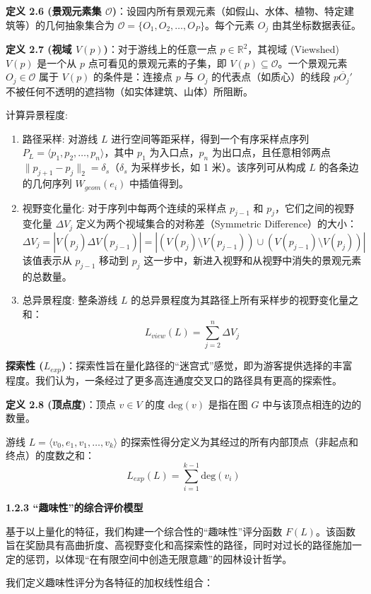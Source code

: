 \documentclass[11pt]{article}
\theoremstyle{definition}
\begin{document}
\textbf{定义 2.6 (景观元素集 $\mathcal{O}$)}：设园内所有景观元素（如假山、水体、植物、特定建筑等）的几何抽象集合为 $\mathcal{O} = \{O_1, O_2, \dots, O_P\}$。每个元素 $O_j$ 由其坐标数据表征。

\textbf{定义 2.7 (视域 $V(p)$)}：对于游线上的任意一点 $p \in \mathbb{R}^2$，其视域 (Viewshed) $V(p)$ 是一个从 $p$ 点可看见的景观元素的子集，即 $V(p) \subseteq \mathcal{O}$。一个景观元素 $O_j \in \mathcal{O}$ 属于 $V(p)$ 的条件是：连接点 $p$ 与 $O_j$ 的代表点（如质心）的线段 $\overline{p O_j'}$ 不被任何不透明的遮挡物（如实体建筑、山体）所阻断。

计算异景程度:
\begin{enumerate}
	\item 路径采样: 对游线 $L$ 进行空间等距采样，得到一个有序采样点序列 $P_L = \langle p_1, p_2, \dots, p_n \rangle$，其中 $p_1$ 为入口点，$p_n$ 为出口点，且任意相邻两点 $\|p_{j+1} - p_j\|_2 = \delta_s$（$\delta_s$ 为采样步长，如 1 米）。该序列可从构成 $L$ 的各条边的几何序列 $W_{geom}(e_i)$ 中插值得到。
	\item 视野变化量化: 对于序列中每两个连续的采样点 $p_{j-1}$ 和 $p_j$，它们之间的视野变化量 $\Delta V_j$ 定义为两个视域集合的对称差（Symmetric Difference）的大小：
	$$ \Delta V_j = |V(p_j) \Delta V(p_{j-1})| = |(V(p_j) \setminus V(p_{j-1})) \cup (V(p_{j-1}) \setminus V(p_j))| $$
	该值表示从 $p_{j-1}$ 移动到 $p_j$ 这一步中，新进入视野和从视野中消失的景观元素的总数量。
	\item 总异景程度: 整条游线 $L$ 的总异景程度为其路径上所有采样步的视野变化量之和：
	$$ L_{view}(L) = \sum_{j=2}^{n} \Delta V_j $$
\end{enumerate}

\textbf{探索性 ($L_{exp}$)}：探索性旨在量化路径的“迷宫式”感觉，即为游客提供选择的丰富程度。我们认为，一条经过了更多高连通度交叉口的路径具有更高的探索性。

\textbf{定义 2.8 (顶点度)}：顶点 $v \in V$ 的度 $\text{deg}(v)$ 是指在图 $G$ 中与该顶点相连的边的数量。

游线 $L = \langle v_0, e_1, v_1, \dots, v_k \rangle$ 的探索性得分定义为其经过的所有内部顶点（非起点和终点）的度数之和：
$$ L_{exp}(L) = \sum_{i=1}^{k-1} \text{deg}(v_i) $$

\textbf{1.2.3 “趣味性”的综合评价模型}

基于以上量化的特征，我们构建一个综合性的“趣味性”评分函数 $F(L)$。该函数旨在奖励具有高曲折度、高视野变化和高探索性的路径，同时对过长的路径施加一定的惩罚，以体现“在有限空间中创造无限意趣”的园林设计哲学。

我们定义趣味性评分为各特征的加权线性组合：
\end{document}
